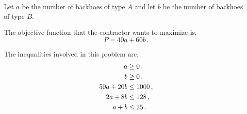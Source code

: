 %
%
\usetikzlibrary{patterns}

\begin{subquestions}


\subquestion

Let $a$ be the number of backhoes of type $A$ and let $b$ be the number of backhoes of type $B$.

\begin{subsubquestions}
	

\subsubquestion

The objective function that the contractor wants to maximize is,
\begin{equation}
	P = 40a + 60b \,.
\end{equation}


\subsubquestion

The inequalities involved in this problem are,
\begin{align}
	a & \geq 0 \,, \nonumber \\
	b & \geq 0 \,, \nonumber \\
	50a + 20b & \leq 1000 \,, \nonumber \\
	2a + 8b & \leq 128\,, \nonumber \\
	a + b & \leq 25\,.
\end{align}


\end{subsubquestions}
\end{subquestions}
